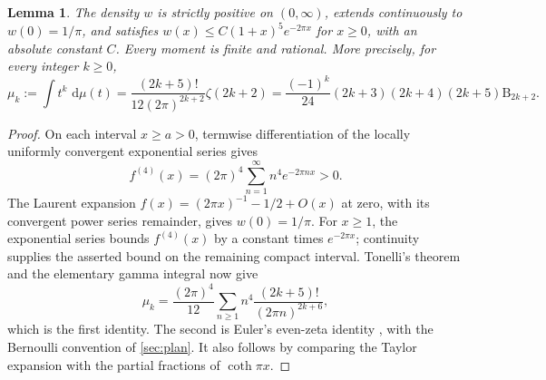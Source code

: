 \documentclass[11pt,letterpaper]{article}
\newtheorem{lemma}[lemma]{Lemma}
\theoremstyle{definition}
\newcommand{\dd}{\,\mathrm d}
\begin{document}
\begin{lemma}\label{lem:positive-measure}
The density $w$ is strictly positive on $(0,\infty)$, extends continuously
to $w(0)=1/\pi$, and satisfies
$w(x)\le C(1+x)^5e^{-2\pi x}$ for $x\ge0$, with an absolute constant $C$.
Every moment is finite and rational. More precisely, for every integer
$k\ge0$,
\begin{equation}\label{eq:rational-moments}
 \mu_k:=\int t^k\,\dd\mu(t)
 =\frac{(2k+5)!}{12(2\pi)^{2k+2}}\zeta(2k+2)
 =\frac{(-1)^k}{24}(2k+3)(2k+4)(2k+5)\mathrm B_{2k+2}.
\end{equation}
\end{lemma}
\begin{proof}
On each interval $x\ge a>0$, termwise differentiation of the locally
uniformly convergent exponential series gives
\[
 f^{(4)}(x)=(2\pi)^4\sum_{n=1}^{\infty}n^4e^{-2\pi nx}>0.
\]
The Laurent expansion $f(x)=(2\pi x)^{-1}-1/2+O(x)$ at zero, with its
convergent power series remainder, gives $w(0)=1/\pi$. For $x\ge1$, the
exponential series bounds $f^{(4)}(x)$ by a constant times $e^{-2\pi x}$;
continuity supplies the asserted bound on the remaining compact interval.
Tonelli's theorem and the elementary gamma integral now give
\[
 \mu_k=\frac{(2\pi)^4}{12}
 \sum_{n\ge1}n^4\frac{(2k+5)!}{(2\pi n)^{2k+6}},
\]
which is the first identity. The second is Euler's even-zeta identity
\cite[\S25.6.2]{dlmf}, with the Bernoulli convention of
\cref{sec:plan}. It also follows by comparing the Taylor expansion with
the partial fractions of $\coth\pi x$.
\end{proof}
\end{document}
